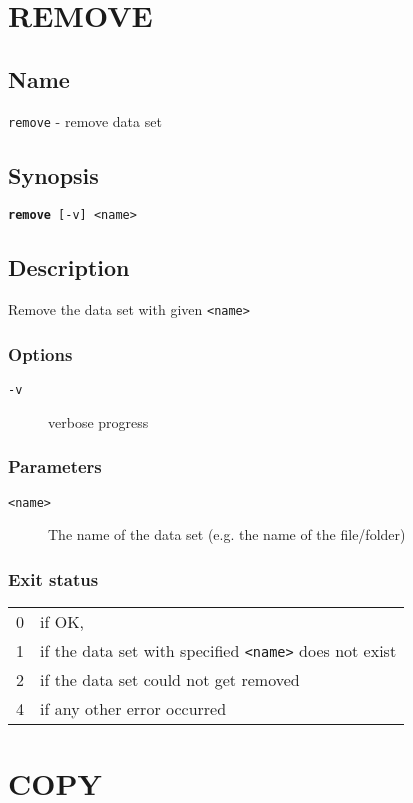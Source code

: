 \documentclass{article} %
\begin{document}
		\newpage
		\section*{REMOVE}
		\subsection*{Name}
		\texttt{remove} - remove data set
		\subsection*{Synopsis}
		\texttt{\textbf{remove} [-v] <name>}
		\subsection*{Description}
		Remove the data set with given \texttt{<name>}\\
		
		\noindent
		\subsubsection*{Options}
		\begin{description}
			\item[\texttt{-v}] verbose progress
		\end{description}
		
		\subsubsection*{Parameters}
		\begin{description}
			\item[\texttt{<name>}] The name of the data set (e.g. the name of the file/folder)
		\end{description}
		\subsubsection*{Exit status}
		\begin{tabular}{ll}
			0 &  if OK,\\ 
			1 &  if the data set with specified \texttt{<name>} does not exist\\ 
			2 &  if the data set could not get removed\\
			4 &  if any other error occurred\\
		\end{tabular}
		\newpage
		\section*{COPY}
\end{document}
